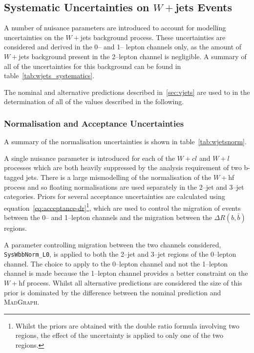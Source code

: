 \subsection{Systematic Uncertainties on $W+$jets Events}
A number of nuisance parameters are introduced to account for modelling
uncertainties on the $W+$jets background process. These uncertainties are
considered and derived in the 0-- and 1-- lepton channels only, as the amount of
$W+$jets background present in the 2--lepton channel is negligible. A summary of
all of the uncertainties for this background can be found in
table~\ref{tab:wjets_systematics}.

The nominal and alternative predictions described in~\ref{sec:vjets} are used to
in the determination of all of the values described in the following. 

\subsubsection{Normalisation and Acceptance Uncertainties}
A summary of the normalisation uncertainties is shown in
table~\ref{tab:wjetsnorm}.

A single nuisance parameter is introduced for each of the $W+cl$ and $W+l$
processes which are both heavily suppressed by the analysis requirement of two
b-tagged jets. There is a large mismodelling of the normalisation of the $W+$hf
process and so floating normalisations are used separately in the 2--jet and
3--jet categories. Priors for several acceptance uncertainties are calculated
using equation~\ref{eq:acceptance-dr}\footnote{Whilst the priors are obtained
  with the double ratio formula involving two regions, the effect of the
  uncertainty is applied to only one of the two regions.}, which are used to
control the migration of events between the 0-- and 1--lepton channels and the
migration between the $\Delta R(b, \bar{b})$ regions.

A parameter controlling migration between the two channels considered,
\texttt{SysWbbNorm\_L0}, is applied to both the 2--jet and 3--jet regions of the
0--lepton channel. The choice to apply to the 0--lepton channel and not the
1--lepton channel is made because the 1--lepton channel provides a better
constraint on the $W+$hf process. Whilst all alternative predictions are
considered the size of this prior is dominated by the difference between the
nominal prediction and \textsc{MadGraph}.

